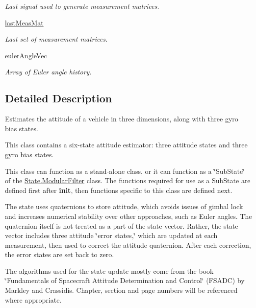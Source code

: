 \begin{DoxyCompactItemize}
\begin{DoxyCompactList}\small\item\em Last signal used to generate measurement matrices. \end{DoxyCompactList}\item 
\hyperlink{classAttitudeSubstate_1_1AttitudeState6DOF_ae23a47fae330703aa8a50b207275c9b0}{last\+Meas\+Mat}
\begin{DoxyCompactList}\small\item\em Last set of measurement matrices. \end{DoxyCompactList}\item 
\hyperlink{classAttitudeSubstate_1_1AttitudeState6DOF_af87f4ef871d05fbd84e7e7c91a2865a3}{euler\+Angle\+Vec}
\begin{DoxyCompactList}\small\item\em Array of Euler angle history. \end{DoxyCompactList}\end{DoxyCompactItemize}


\subsection{Detailed Description}
Estimates the attitude of a vehicle in three dimensions, along with three gyro bias states. 

This class contains a six-\/state attitude estimator\+: three attitude states and three gyro bias states.

This class can function as a stand-\/alone class, or it can function as a \char`\"{}\+Sub\+State\char`\"{} of the \hyperlink{classState_1_1ModularFilter}{State.\+Modular\+Filter} class. The functions required for use as a Sub\+State are defined first after {\bfseries init}, then functions specific to this class are defined next.

The state uses quaternions to store attitude, which avoids issues of gimbal lock and increases numerical stability over other approaches, such as Euler angles. The quaternion itself is not treated as a part of the state vector. Rather, the state vector includes three attitude \char`\"{}error states,\char`\"{} which are updated at each measurement, then used to correct the attitude quaternion. After each correction, the error states are set back to zero.

The algorithms used for the state update mostly come from the book \char`\"{}\+Fundamentals of Spacecraft Attitude Determination and Control\char`\"{} (F\+S\+A\+DC) by Markley and Crassidis. Chapter, section and page numbers will be referenced where appropriate. 

